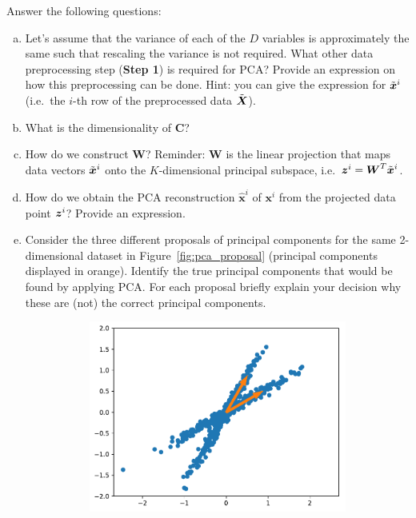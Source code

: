 \documentclass[11pt,a4paper]{article}
\begin{document}
Answer the following questions:

\begin{enumerate}[(a)]
\item Let's assume that the variance of each of the $D$ variables is approximately the same such that rescaling the variance is not required. What other data preprocessing step (\textbf{Step 1}) is required for PCA? Provide an expression on how this preprocessing can be done. Hint: you can give the expression for $\tilde{\boldsymbol{x}}^{i}$ (i.e.~the $i$-th row of the preprocessed data $\tilde{\boldsymbol{X}}$).
\item What is the dimensionality of $\boldsymbol{C}$?
\item How do we construct $\boldsymbol{W}$? Reminder: $\boldsymbol{W}$ is the linear projection that maps data vectors $\tilde{\boldsymbol{x}}^{i}$ onto the $K$-dimensional principal subspace, i.e.~$\boldsymbol{z}^i=\boldsymbol{W}^T\tilde{\boldsymbol{x}}^{i}$.
\item How do we obtain the PCA reconstruction $\boldsymbol{\hat{x}}^i$ of $\boldsymbol{x}^i$ from the projected data point $\boldsymbol{z}^i$? Provide an expression.
\item Consider the three different proposals of principal components  for the same 2-dimensional dataset in Figure~\ref{fig:pca_proposal} (principal components displayed in orange). Identify the true principal components that would be found by applying PCA. For each proposal briefly explain your decision why these are (not) the correct principal components.
    \begin{figure}[ht]
        \centering
        \begin{subfigure}{.33\textwidth}
          \centering
          \includegraphics[width=\linewidth]{pca_opt1}

\end{subfigure}
\end{figure}
\end{enumerate}
\end{document}
